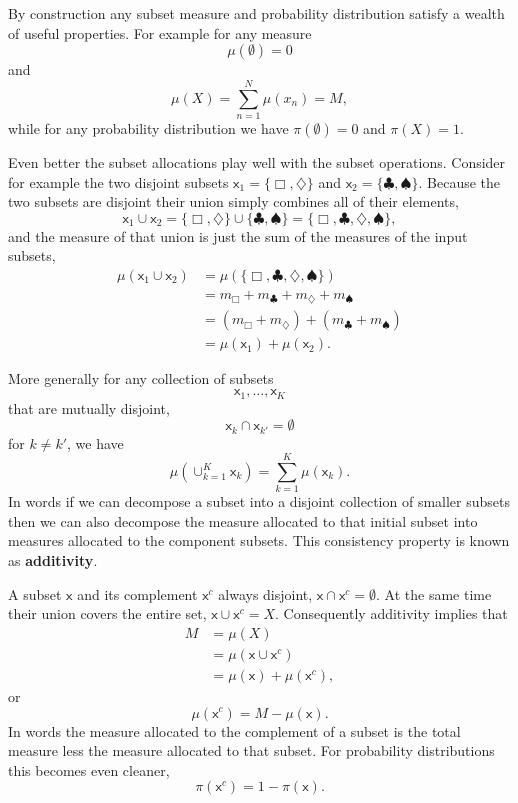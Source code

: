 \documentclass[
  letterpaper,
  DIV=11,
  numbers=noendperiod]{scrartcl}
\begin{document}
By construction any subset measure and probability distribution satisfy
a wealth of useful properties. For example for any measure \[
\mu( \emptyset ) = 0
\] and \[
\mu( X ) = \sum_{n = 1}^{N} \mu(x_{n}) = M,
\] while for any probability distribution we have
\(\pi( \emptyset ) = 0\) and \(\pi( X ) = 1\).

Even better the subset allocations play well with the subset operations.
Consider for example the two disjoint subsets
\(\mathsf{x}_{1} = \{ \Box, \diamondsuit \}\) and
\(\mathsf{x}_{2} = \{ \clubsuit, \spadesuit \}\). Because the two
subsets are disjoint their union simply combines all of their elements,
\[
\mathsf{x}_{1} \cup \mathsf{x}_{2}
=
\{ \Box, \diamondsuit \} \cup \{ \clubsuit, \spadesuit \}
=
\{ \Box, \clubsuit, \diamondsuit, \spadesuit \},
\] and the measure of that union is just the sum of the measures of the
input subsets, \begin{align*}
\mu ( \mathsf{x}_{1} \cup \mathsf{x}_{2} )
&=
\mu ( \{ \Box, \clubsuit, \diamondsuit, \spadesuit \} )
\\
&=
m_{\Box} + m_{\clubsuit} + m_{\diamondsuit} + m_{\spadesuit}
\\
&=
( m_{\Box} + m_{\diamondsuit} ) + ( m_{\clubsuit} + m_{\spadesuit} )
\\
&=
\mu( \mathsf{x}_{1} ) + \mu( \mathsf{x}_{2} ).
\end{align*}

More generally for any collection of subsets \[
\mathsf{x}_{1}, \ldots, \mathsf{x}_{K}
\] that are mutually disjoint, \[
\mathsf{x}_{k} \cap \mathsf{x}_{k'} = \emptyset
\] for \(k \ne k'\), we have \[
\mu ( \cup_{k = 1}^{K} \mathsf{x}_{k} )
=
\sum_{k = 1}^{K} \mu ( \mathsf{x}_{k} ).
\] In words if we can decompose a subset into a disjoint collection of
smaller subsets then we can also decompose the measure allocated to that
initial subset into measures allocated to the component subsets. This
consistency property is known as \textbf{additivity}.

A subset \(\mathsf{x}\) and its complement \(\mathsf{x}^{c}\) always
disjoint, \(\mathsf{x} \cap \mathsf{x}^{c} = \emptyset\). At the same
time their union covers the entire set,
\(\mathsf{x} \cup \mathsf{x}^{c} = X\). Consequently additivity implies
that \begin{align*}
M
&=
\mu (X)
\\
&=
\mu ( \mathsf{x} \cup \mathsf{x}^{c} )
\\
&= \mu ( \mathsf{x} ) + \mu ( \mathsf{x}^{c} ),
\end{align*} or \[
\mu ( \mathsf{x}^{c} ) = M - \mu ( \mathsf{x} ).
\] In words the measure allocated to the complement of a subset is the
total measure less the measure allocated to that subset. For probability
distributions this becomes even cleaner, \[
\pi ( \mathsf{x}^{c} ) = 1 - \pi ( \mathsf{x} ).
\]
\end{document}
